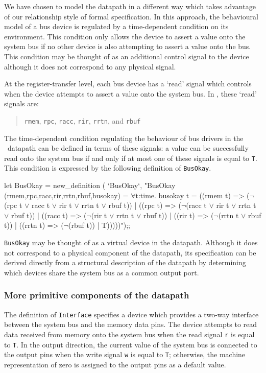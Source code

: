 We have chosen to model the datapath in a different way which
takes advantage of our relationship style of formal specification.
In this approach,
the behavioural model of a bus device is regulated
by a time-dependent condition on its environment.
This condition only allows the device to assert a value
onto the system bus if no other device is also attempting to
assert a value onto the bus.
This condition may be thought of as an
additional control signal to the device
although it does not correspond to any physical signal.

At the register-transfer level,
each bus device has a `read' signal which controls when
the device attempts to assert a value onto the system bus.
In \Tamarack, these `read' signals are:

\begin{quote}
\verb"rmem", \verb"rpc", \verb"racc", \verb"rir", \verb"rrtn",
and \verb"rbuf"
\end{quote}

The time-dependent condition regulating the behaviour of bus drivers
in the \Tamarack\ datapath
can be defined in terms of these signals:
a value can be successfully read onto the system bus if and only if
at most one of these signals is equal to \verb"T".
This condition is expressed by the following definition of
\verb"BusOkay".

\begintt
let BusOkay = new_definition (
  `BusOkay`,
  "BusOkay (rmem,rpc,racc,rir,rrtn,rbuf,busokay) =
    \(\forall\)t:time.
      busokay t =
        ((rmem t)  => (\(\neg\)(rpc t \(\vee\) racc t \(\vee\) rir t \(\vee\) rrtn t \(\vee\) rbuf t)) |
        ((rpc t)  => (\(\neg\)(racc t \(\vee\) rir t \(\vee\) rrtn t \(\vee\) rbuf t)) |
        ((racc t)  => (\(\neg\)(rir t \(\vee\) rrtn t \(\vee\) rbuf t)) |
        ((rir t)  => (\(\neg\)(rrtn t \(\vee\) rbuf t)) |
        ((rrtn t)  => (\(\neg\)(rbuf t)) |
                     T)))))");;
\endtt

\verb"BusOkay" may be thought of as a virtual device in the datapath.
Although it does not correspond to a physical component of the datapath,
its specification can be derived directly
from a structural description of the datapath by determining which
devices share the system bus as a common output port.

\subsubsection{More primitive components of the datapath}

The definition of \verb"Interface" specifies a device which provides
a two-way interface between the system bus and the memory data pins.
The device attempts to read
data received from memory onto the system bus when the
read signal \verb"r" is equal to \verb"T".
In the output direction,
the current value of the system bus is connected to the output pins
when the write signal \verb"w" is equal to \verb"T"; otherwise,
the machine representation of zero is assigned to the output pins
as a default value.

